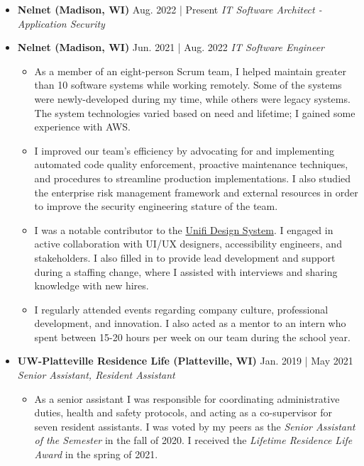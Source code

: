 \documentclass[11pt]{article}
\newcommand{\job}[3]{\vspace{1.5mm}
  \textbf{#1} \hfill #2 \linebreak \textit{#3}
}
\begin{document}
\begin{itemize}[leftmargin=*]
	\item[]
	      \job
	      {Nelnet (Madison, WI)}
	      {Aug. 2022 | Present}
	      {IT Software Architect - Application Security}
	\item[]
	      \job
	      {Nelnet (Madison, WI)}
	      {Jun. 2021 | Aug. 2022}
	      {IT Software Engineer}
	      \begin{itemize}
	      	\item As a member of an eight-person Scrum team, I helped maintain greater than 10 software systems while working remotely. Some of the systems were newly-developed during my time, while others were legacy systems. The system technologies varied based on need and lifetime; I gained some experience with AWS.
                     \item I improved our team's efficiency by advocating for and implementing automated code quality enforcement, proactive maintenance techniques, and procedures to streamline production implementations. I also studied the enterprise risk management framework and external resources in order to improve the security engineering stature of the team.
                     \item I was a notable contributor to the \href{https://unifi.nelnet.io/}{Unifi Design System}. I engaged in active collaboration with UI/UX designers, accessibility engineers, and stakeholders. I also filled in to provide lead development and support during a staffing change, where I assisted with interviews and sharing knowledge with new hires.
                     \item I regularly attended events regarding company culture, professional development, and innovation. I also acted as a mentor to an intern who spent between 15-20 hours per week on our team during the school year.
	      \end{itemize}
	\item[]
	      \job
	      {UW-Platteville Residence Life (Platteville, WI)}
	      {Jan. 2019 | May 2021}
	      {Senior Assistant, Resident Assistant}
	      \begin{itemize}
	      	\item As a senior assistant I was responsible for coordinating administrative duties, health and safety protocols, and acting as a co-supervisor for seven resident assistants. I was voted by my peers as the \emph{Senior Assistant of the Semester} in the fall of 2020. I received the \emph{Lifetime Residence Life Award} in the spring of 2021.

\end{itemize}
\end{itemize}
\end{document}
